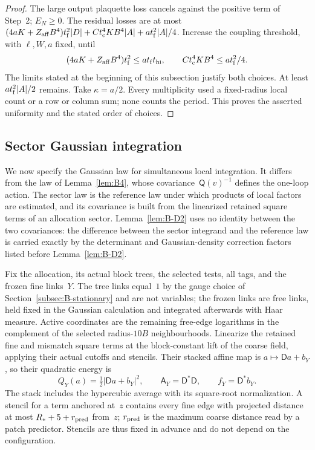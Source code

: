 \begin{proof}
The large output plaquette loss cancels against the positive term of Step~2; $E_N\ge0$. The residual losses are at most $(4aK+Z_{\rm aff}B^4)t_{\rm f}^2|D|+Ct_{\rm c}^4KB^4|A|+at_{\rm f}^2|A|/4$. Increase the coupling threshold, with $\ell,W,a$ fixed, until
\begin{equation*}
(4aK+Z_{\rm aff}B^4)t_{\rm f}^2\le at_{\rm f}t_{\rm hi},\qquad Ct_{\rm c}^4KB^4\le at_{\rm f}^2/4.
\end{equation*}
The limits stated at the beginning of this subsection justify both choices. At least $at_{\rm f}^2|A|/2$ remains. Take $\kappa=a/2$. Every multiplicity used a fixed-radius local count or a row or column sum; none counts the period. This proves the asserted uniformity and the stated order of choices.
\end{proof}

\subsection{Sector Gaussian integration}\label{subsec:B-sector}

We now specify the Gaussian law for simultaneous local integration. It differs from the law of Lemma~\ref{lem:B4}, whose covariance~$\mathsf Q(v)^{-1}$ defines the one-loop action. The sector law is the reference law under which products of local factors are estimated, and its covariance is built from the linearized retained square terms of an allocation sector. Lemma~\ref{lem:B-D2} uses no identity between the two covariances: the difference between the sector integrand and the reference law is carried exactly by the determinant and Gaussian-density correction factors listed before Lemma~\ref{lem:B-D2}.

Fix the allocation, its actual block trees, the selected tests, all tags, and the frozen fine links~$Y$. The tree links equal~$1$ by the gauge choice of Section~\ref{subsec:B-stationary} and are not variables; the frozen links are free links, held fixed in the Gaussian calculation and integrated afterwards with Haar measure. Active coordinates are the remaining free-edge logarithms in the complement of the selected radius-$10B$ neighbourhoods. Linearize the retained fine and mismatch square terms at the block-constant lift of the coarse field, applying their actual cutoffs and stencils. Their stacked affine map is $a\mapsto\mathsf D a+b_Y$, so their quadratic energy is
\begin{equation*}
Q_Y(a)=\tfrac12|\mathsf D a+b_Y|^2,\qquad \mathsf A_Y=\mathsf D^*\mathsf D,\qquad f_Y=\mathsf D^*b_Y.
\end{equation*}
The stack includes the hypercubic average with its square-root normalization. A stencil for a term anchored at~$z$ contains every fine edge with projected distance at most $R_*+5+r_{\rm pred}$ from~$z$; $r_{\rm pred}$ is the maximum coarse distance read by a patch predictor. Stencils are thus fixed in advance and do not depend on the configuration.


